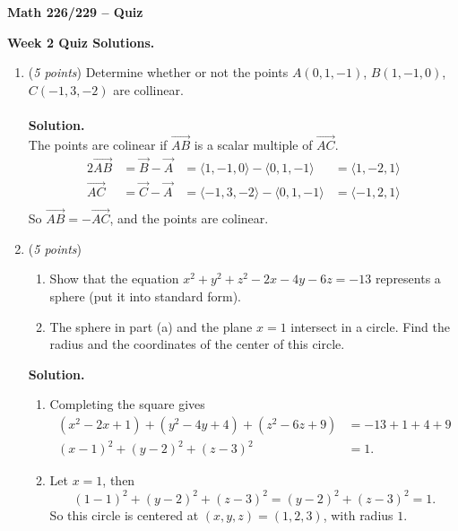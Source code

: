 \documentclass[12 pt]{article}
\begin{document}
	\begin{center}
		\textbf{\hfill Math 226/229 -- Quiz} \\
	\end{center}
	\medskip

	\noindent
	\textbf{Week 2 Quiz Solutions.} \hfill
	\vspace{.1in}
	\hspace*{0.2in}
	\medskip
	\noindent
	\begin{enumerate}
	  \item (\textit{5 points})
	    Determine whether or not the points $A(0,1,-1)$, $B(1,-1,0)$, $C(-1,3,-2)$ are collinear.
			\\~\\
			\textbf{Solution.}
			\\
			The points are colinear if $\overrightarrow{AB}$ is a scalar multiple of
			$\overrightarrow{AC}$.
			\begin{alignat*}{2}
				\overrightarrow{AB}
					&= \vec{B} - \vec{A}
					&= \langle1, -1, 0\rangle - \langle0, 1, -1\rangle
					&= \langle1, -2, 1\rangle \\
				\overrightarrow{AC}
					&= \vec{C} - \vec{A}
					&= \langle-1, 3, -2\rangle - \langle0, 1, -1\rangle
					&= \langle-1, 2, 1\rangle \\
			\end{alignat*}
			So $\overrightarrow{AB} = -\overrightarrow{AC}$, and the points are colinear.

			\vspace{1in}

    \item (\textit{5 points})
    \begin{enumerate}
      \item Show that the equation $x^2+y^2+z^2-2x-4y-6z = -13$ represents a sphere (put it into standard form).
      \item The sphere in part (a) and the plane $x=1$ intersect in a circle. Find the radius and the coordinates of the center of this circle.
    \end{enumerate}
		\textbf{Solution.}
		\begin{enumerate}
			\item Completing the square gives \begin{align*}
				(x^2 - 2x + 1) + (y^2 -4y + 4) + (z^2 - 6z + 9) &= -13 + 1 + 4 + 9 \\
				(x - 1)^2 + (y - 2)^2 + (z - 3)^2 &= 1.
			\end{align*}
			\item Let $x = 1$, then \[
				(1 - 1)^2 + (y - 2)^2 + (z - 3)^2 = (y - 2)^2 + (z - 3)^2 = 1.
			\] So this circle is centered at $(x, y, z) = (1, 2, 3)$, with radius $1$.
		\end{enumerate}
	\end{enumerate}
\end{document}
